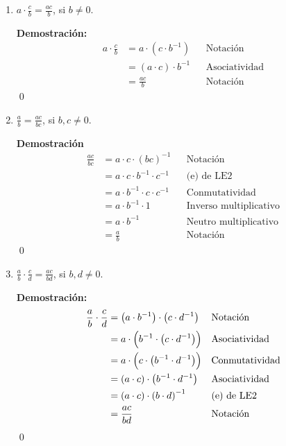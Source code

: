 \documentclass[11pt]{article}
\begin{document}
\begin{enumerate}[label=\alph*)]
    \item $a \cdot \frac{c}{b} = \frac{ac}{b}$, si $b \neq 0$.
    
    \textbf{Demostración:} \begin{align*}
        a \cdot \frac{c}{b} &= a \cdot \left( c \cdot b^{-1} \right) && \text{Notación}\\
        &= \left( a \cdot c \right) \cdot b^{-1} && \text{Asociatividad}\\
        &= \frac{ac}{b} && \text{Notación}
    \end{align*} \qed
    
    \item $\frac{a}{b} = \frac{ac}{bc}$, si $b,c \neq 0$.
    
    \textbf{Demostración}\begin{align*}
        \frac{ac}{bc} &= a \cdot c \cdot \left( bc \right)^{-1} && \text{Notación}\\
        &= a \cdot c \cdot b^{-1} \cdot c^{-1} && \text{(e) de LE2}\\
        &= a \cdot b^{-1} \cdot c \cdot c^{-1} && \text{Conmutatividad}\\
        &= a \cdot b^{-1} \cdot 1 && \text{Inverso multiplicativo}\\
        &= a \cdot b^{-1} && \text{Neutro multiplicativo}\\
        &= \frac{a}{b} && \text{Notación}
    \end{align*}\qed

    \item $\frac{a}{b} \cdot \frac{c}{d} = \frac{ac}{bd}$, si $b, d \neq 0$.
    
    \textbf{Demostración:}\begin{align*}
        \frac{a}{b} \cdot \frac{c}{d} &= \left( a \cdot b^{-1} \right) \cdot \left( c \cdot d^{-1} \right) && \text{Notación}\\
            &= a \cdot \Bigl( b^{-1} \cdot \left( c \cdot d^{-1} \right) \Bigr) && \text{Asociatividad}\\
                &= a \cdot \Bigl( c \cdot \left( b^{-1} \cdot d^{-1} \right) \Bigr) && \text{Conmutatividad}\\
        &= \left( a \cdot c \right) \cdot \left( b^{-1} \cdot d^{-1} \right) && \text{Asociatividad}\\
        &= \left( a \cdot c \right) \cdot \left( b \cdot d \right)^{-1} && \text{(e) de LE2}\\
        &= \frac{ac}{bd} && \text{Notación}
    \end{align*}\qed


\end{enumerate}
\end{document}

